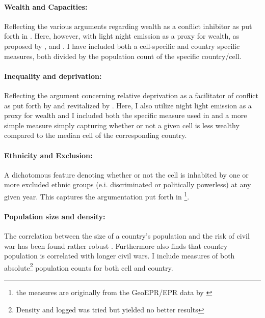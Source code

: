 \documentclass[a4paper]{article}
\begin{document}

\paragraph{Wealth and Capacities:} Reflecting the various arguments regarding wealth as a conflict inhibitor as put forth in \cite{Collier_Hoeffler_1998, Fearon_Laitin_2003, Collier_Hoeffler_2004}. Here, however, with light night emission as a proxy for wealth, as proposed by \cite{Elvidge_2009}, \cite{Chen_Nordhuas_2011} and \cite{Cederman_Gleditsch_Buhaug_2013}. I have included both a cell-specific and country specific measures, both divided by the population count of the specific country/cell.\par

\paragraph{Inequality and deprivation:} Reflecting the argument concerning relative deprivation as a facilitator of conflict as put forth by \cite{Gurr_1970} and revitalized by \cite{Cederman_Gleditsch_Buhaug_2013}. Here, I also utilize night light emission as a proxy for wealth and I included both the specific measure used in \cite{Cederman_Gleditsch_Buhaug_2013} and a more simple measure simply capturing whether or not a given cell is less wealthy compared to the median cell of the corresponding country.\par

\paragraph{Ethnicity and Exclusion:} A dichotomous feature denoting whether or not the cell is inhabited by one or more excluded ethnic groups (e.i. discriminated or politically powerless) at any given year. This captures the argumentation put forth in \cite{Cederman_Weidmann_Gleditsch_2011, Cederman_Gleditsch_Buhaug_2013}\footnote{the measures are originally from the GeoEPR/EPR data by \cite{Vogt_2015}}.\par

\paragraph{Population size and density:} The correlation between the size of a country's population and the risk of civil war has been found rather robust \citep{Collier_Hoeffler_1998, Fearon_Laitin_2003, Collier_Hoeffler_2004, Hegre_Sambanis_2006}. Furthermore \cite[287]{Fearon_2004} also finds that country population is correlated with longer civil wars. I include measures of both absolute\footnote{Density and logged was tried but yielded no better results} population counts for both cell and country.\par 
\end{document}
